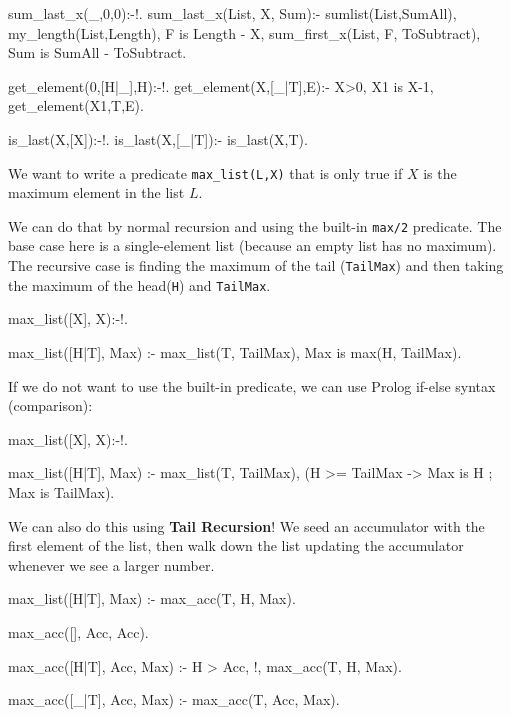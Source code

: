 
\begin{codeblock}
sum_last_x(_,0,0):-!.
sum_last_x(List, X, Sum):-
    sumlist(List,SumAll),
    my_length(List,Length),
    F is Length - X,
    sum_first_x(List, F, ToSubtract),
    Sum is SumAll - ToSubtract.
\end{codeblock}


\begin{codeblock}
get_element(0,[H|_],H):-!.
get_element(X,[_|T],E):-
    X>0,
    X1 is X-1,
    get_element(X1,T,E).
\end{codeblock}


\begin{codeblock}
is_last(X,[X]):-!.
is_last(X,[_|T]):-
    is_last(X,T).
\end{codeblock}

We want to write a predicate \texttt{max\_list(L,X)} that is only true if $X$ is the maximum element in the list $L$. 

We can do that by normal recursion and using the built-in \texttt{max/2} predicate. The base case here is a single-element list (because an empty list has no maximum). The recursive case is finding the maximum of the tail (\texttt{TailMax}) and then taking the maximum of the head(\texttt{H}) and \texttt{TailMax}.

\begin{codeblock}
max_list([X], X):-!.

max_list([H|T], Max) :-
    max_list(T, TailMax),
    Max is max(H, TailMax).
\end{codeblock}

If we do not want to use the built-in predicate, we can use Prolog if-else syntax (comparison):

\begin{codeblock}
max_list([X], X):-!.

max_list([H|T], Max) :-
    max_list(T, TailMax),
    (H >= TailMax -> Max is H ; Max is TailMax).
\end{codeblock}

We can also do this using \textbf{Tail Recursion}! We seed an accumulator with the first element of the list, then walk down the list updating the accumulator whenever we see a larger number.

\begin{codeblock}
max_list([H|T], Max) :-
    max_acc(T, H, Max).

max_acc([], Acc, Acc).

max_acc([H|T], Acc, Max) :-
    H > Acc, !,
    max_acc(T, H, Max).

max_acc([_|T], Acc, Max) :-
    max_acc(T, Acc, Max).    
\end{codeblock}

